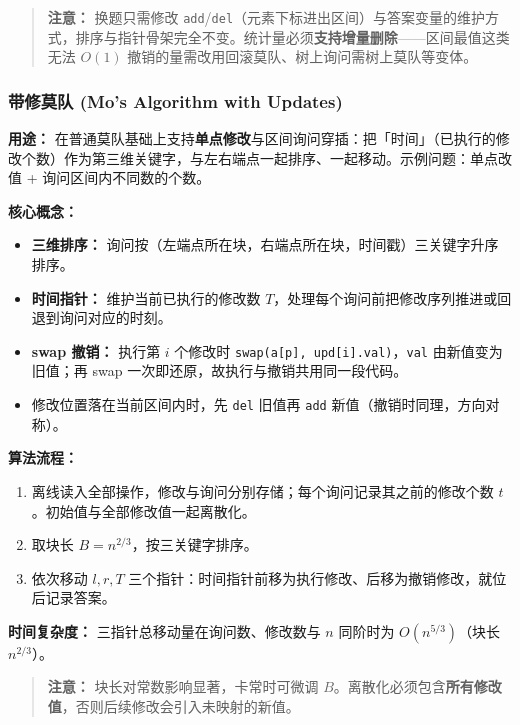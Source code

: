 

\begin{quote}
\textbf{注意：} 换题只需修改 \texttt{add}/\texttt{del}（元素下标进出区间）与答案变量的维护方式，排序与指针骨架完全不变。统计量必须\textbf{支持增量删除}——区间最值这类无法 $O(1)$ 撤销的量需改用回滚莫队、树上询问需树上莫队等变体。
\end{quote}

\subsubsection{带修莫队 (Mo's Algorithm with Updates)}

\textbf{用途：}
在普通莫队基础上支持\textbf{单点修改}与区间询问穿插：把「时间」（已执行的修改个数）作为第三维关键字，与左右端点一起排序、一起移动。示例问题：单点改值 + 询问区间内不同数的个数。

\textbf{核心概念：}
\begin{itemize}
  \item \textbf{三维排序：} 询问按（左端点所在块，右端点所在块，时间戳）三关键字升序排序。
  \item \textbf{时间指针：} 维护当前已执行的修改数 $T$，处理每个询问前把修改序列推进或回退到询问对应的时刻。
  \item \textbf{swap 撤销：} 执行第 $i$ 个修改时 \texttt{swap(a[p], upd[i].val)}，\texttt{val} 由新值变为旧值；再 swap 一次即还原，故执行与撤销共用同一段代码。
  \item 修改位置落在当前区间内时，先 \texttt{del} 旧值再 \texttt{add} 新值（撤销时同理，方向对称）。
\end{itemize}

\textbf{算法流程：}
\begin{enumerate}
  \item 离线读入全部操作，修改与询问分别存储；每个询问记录其之前的修改个数 $t$。初始值与全部修改值一起离散化。
  \item 取块长 $B = n^{2/3}$，按三关键字排序。
  \item 依次移动 $l, r, T$ 三个指针：时间指针前移为执行修改、后移为撤销修改，就位后记录答案。
\end{enumerate}

\textbf{时间复杂度：} 三指针总移动量在询问数、修改数与 $n$ 同阶时为 $O(n^{5/3})$（块长 $n^{2/3}$）。



\begin{quote}
\textbf{注意：} 块长对常数影响显著，卡常时可微调 $B$。离散化必须包含\textbf{所有修改值}，否则后续修改会引入未映射的新值。
\end{quote}
